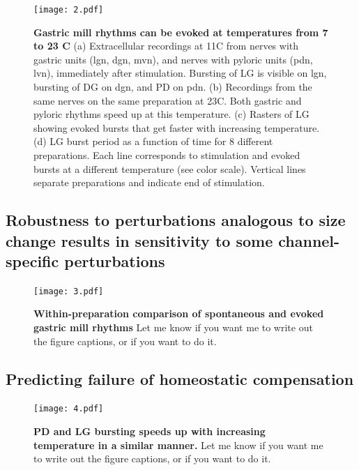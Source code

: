 \documentclass[9pt,lineno]{elife}
\begin{document}
\begin{figure}
\begin{fullwidth}
\texttt{[image: 2.pdf]}

\caption{\textbf{Gastric mill rhythms can be evoked at temperatures from 7 to 23 C }  (a) Extracellular recordings at 11\degree C from nerves with gastric units (lgn, dgn, mvn), and nerves with pyloric units (pdn, lvn), immediately after stimulation. Bursting of LG is visible on lgn, bursting of DG on dgn, and PD on pdn. (b) Recordings from the same nerves on the same preparation at 23\degree C. Both gastric and pyloric rhythms speed up at this temperature. (c) Rasters of LG showing evoked bursts that get faster with increasing temperature. (d) LG burst period as a function of time for 8 different preparations. Each line corresponds to stimulation and evoked bursts at a different temperature (see color scale). Vertical lines separate preparations and indicate end of stimulation. } 
\label{fig:2}
\end{fullwidth}
\end{figure}




\subsection{Robustness to perturbations analogous to size change results in sensitivity to some channel-specific perturbations}


\begin{figure}
\begin{fullwidth}
\texttt{[image: 3.pdf]}

\caption{\textbf{Within-preparation comparison of spontaneous and evoked gastric mill rhythms} Let me know if you want me to write out the figure captions, or if you want to do it.  }
\label{fig:2}
\end{fullwidth}
\end{figure}


\lipsum[1-4]

\subsection{Predicting failure of homeostatic compensation}

\begin{figure}[!hbp]
\centering
\begin{fullwidth}
\texttt{[image: 4.pdf]}
\end{fullwidth}
\caption{\textbf{PD and LG bursting speeds up with increasing temperature in a similar manner.} Let me know if you want me to write out the figure captions, or if you want to do it.   }
\end{figure}
\end{document}
